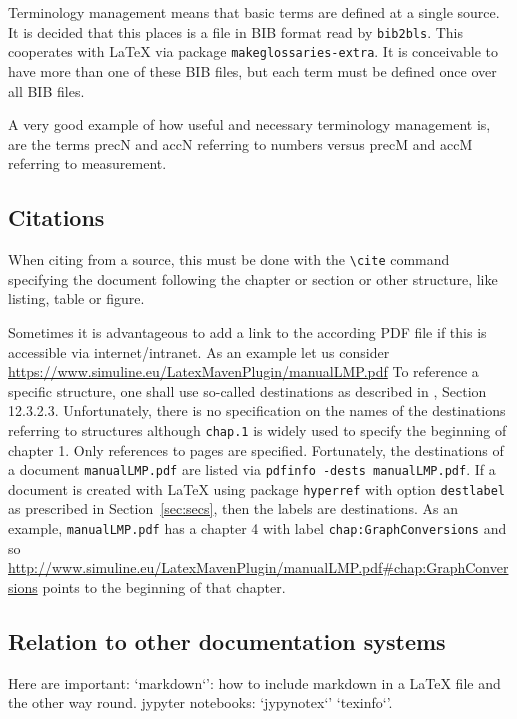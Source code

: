 \documentclass[a4paper,12pt]{article}
\begin{document}
Terminology management means that basic terms are defined at a single source. 
It is decided that this places is a file in BIB format read by \texttt{bib2bls}. 
This cooperates with \LaTeX{} via package \texttt{makeglossaries-extra}. 
It is conceivable to have more than one of these BIB files, 
but each term must be defined once over all BIB files. 

A very good example of how useful and necessary terminology management is, 
are the terms \gls{precN} and \gls{accN} referring to numbers 
versus \gls{precM} and \gls{accM} referring to measurement. 

\subsection{Citations}

When citing from a source, this must be done with the \texttt{\textbackslash cite} 
command specifying the document following the chapter or section or other structure, 
like listing, table or figure. 

Sometimes it is advantageous to add a link to the according PDF file 
if this is accessible via internet/intranet. 
As an example let us consider \url{https://www.simuline.eu/LatexMavenPlugin/manualLMP.pdf}
To reference a specific structure, 
one shall use so-called destinations as described in \cite{Pdf17}, 
Section 12.3.2.3. 
Unfortunately, there is no specification on the names of the destinations 
referring to structures 
although \texttt{chap.1} is widely used to specify the beginning of chapter 1. 
Only references to pages are specified. 
Fortunately, the destinations of a document \texttt{manualLMP.pdf} 
are listed via \texttt{pdfinfo -dests manualLMP.pdf}. 
If a document is created with \LaTeX{} using package \texttt{hyperref} 
with option \texttt{destlabel} as prescribed in Section~\ref{sec:secs}, 
then the labels are destinations. 
As an example, \texttt{manualLMP.pdf} has a chapter 4 with label \texttt{chap:GraphConversions}
and so \url{http://www.simuline.eu/LatexMavenPlugin/manualLMP.pdf#chap:GraphConversions} 
points to the beginning of that chapter. 

\subsection{Relation to other documentation systems}

Here are important: 
`markdown`': how to include markdown in a \LaTeX{} file and the other way round. 
jypyter notebooks: `jypynotex`'
`texinfo`'. 



\printunsrtglossaries%

\end{document}
